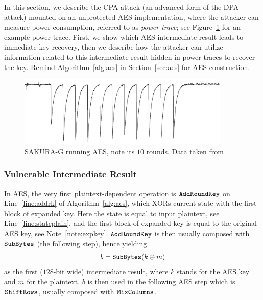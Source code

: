In this section, we describe the CPA attack (an advanced form of the DPA attack) mounted on an unprotected AES implementation, where the attacker can measure power consumption, referred to as {\em power trace}; see Figure~\ref{fig:powertrace} for an example power trace. First, we show which AES intermediate result leads to immediate key recovery, then we describe how the attacker can utilize information related to this intermediate result hidden in power traces to recover the key. Remind Algorithm~\ref{alg:aes} in Section~\ref{sec:aes} for AES construction.

\begin{figure}[h]
\begin{center}
	\includegraphics[width=0.9\textwidth]{./figures/power_trace/power_trace.png}
	\caption{SAKURA-G running AES, note its $10$ rounds. Data taken from \cite{exampletraces}.}
	\label{fig:powertrace}
\end{center}
\end{figure}

\subsubsection{Vulnerable Intermediate Result}
	
	In AES, the very first plaintext-dependent operation is $\texttt{AddRoundKey}$ on Line~\ref{line:addrk} of Algorithm~\ref{alg:aes}, which XORs current state with the first block of expanded key. Here the state is equal to input plaintext, see Line~\ref{line:stateplain}, and the first block of expanded key is equal to the original AES key, see Note~\ref{note:expkey}. $\texttt{AddRoundKey}$ is then usually composed with $\texttt{SubBytes}$ (the following step), hence yielding
	\begin{equation}
	\label{eq:byprod}
		b = \texttt{SubBytes}(k\oplus m)
	\end{equation}
	as the first ($128$-bit wide) intermediate result, where $k$ stands for the AES key and $m$ for the plaintext. $b$ is then used in the following AES step which is $\texttt{ShiftRows}$, usually composed with $\texttt{MixColumns}$.
		
